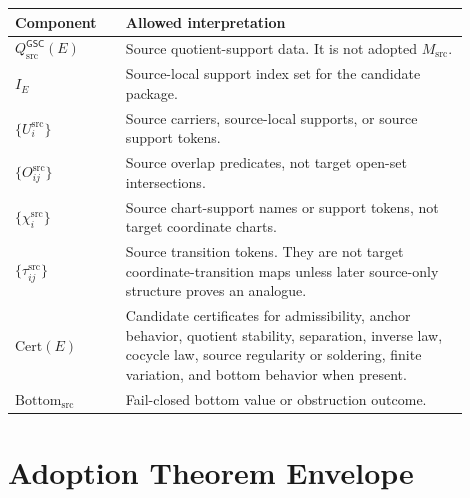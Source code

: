 \documentclass[11pt]{article}
\newcommand{\GSC}{\mathsf{GSC}}
\newcommand{\Msrc}{M_{\mathrm{src}}}
\newcommand{\Qsrc}{Q_{\mathrm{src}}^{\GSC}}
\newcommand{\Bottomsrc}{\mathrm{Bottom}_{\mathrm{src}}}
\begin{document}
\begin{longtable}{|p{0.22\linewidth}|p{0.68\linewidth}|}
\hline
\textbf{Component} & \textbf{Allowed interpretation} \\
\hline
\(\Qsrc(E)\) & Source quotient-support data. It is not adopted \(\Msrc\). \\
\hline
\(I_E\) & Source-local support index set for the candidate package. \\
\hline
\(\{U_i^{\mathrm{src}}\}\) & Source carriers, source-local supports, or source support tokens. \\
\hline
\(\{O_{ij}^{\mathrm{src}}\}\) & Source overlap predicates, not target open-set intersections. \\
\hline
\(\{\chi_i^{\mathrm{src}}\}\) & Source chart-support names or support tokens, not target coordinate charts. \\
\hline
\(\{\tau_{ij}^{\mathrm{src}}\}\) & Source transition tokens. They are not target coordinate-transition maps unless later source-only structure proves an analogue. \\
\hline
\(\mathrm{Cert}(E)\) & Candidate certificates for admissibility, anchor behavior, quotient stability, separation, inverse law, cocycle law, source regularity or soldering, finite variation, and bottom behavior when present. \\
\hline
\(\Bottomsrc\) & Fail-closed bottom value or obstruction outcome. \\
\hline
\end{longtable}

\section{Adoption Theorem Envelope}
\end{document}
